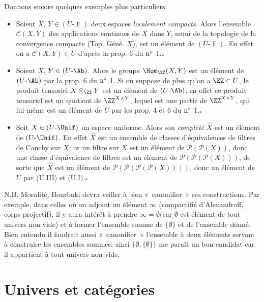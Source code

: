 Donnons encore quelques exemples plus particuliers:
\begin{itemize}
\item[* 1)] Soient $X$, $Y\in (U\text{-}\Top)$ deux espaces \emph{localement
compacts}. Alors l'ensemble $\mathscr{C}(X,Y)$ des applications
continues de $X$ dans $Y$, muni de la topologie de la convergence
compacte (Top. Géné. $X$), est un élément de $(U\text{-}\Top)$. En
effet on a $\mathscr{C}(X,Y)\in U$ d'après la prop. 6 du ${\rm
n^{\circ}}$ 1.${}_{\mbox{*}}$

\item[* 2)] Soient $X$, $Y\in (U\text{-}\Ab)$. Alors le groupe
$\Hom_{\ZZ}(X,Y)$ est un élément de $(U\text{-}\Ab)$ par la prop. 6
du ${\rm n^{\circ}}$ 1. Si on suppose de plus qu'on a $\ZZ\in U$, le
produit tensoriel $X\otimes_{\ZZ}Y$ est un élément de
$(U\text{-}\Ab)$; en effet ce produit tensoriel est un quotient de
$\ZZ^{X\times Y}$, lequel est une partie de $\ZZ^{X\times Y}$, qui
lui-même est un élément de $U$ par les prop. 4 et 6 du ${\rm
n^{\circ}}$ 1.${}_{\mbox{*}}$

\item[* 3)] Soit $X\in (U\text{-}\Unif)$ un espace uniforme. Alors son
\emph{complété} $\widehat{X}$ est un élément de $(U\text{-}\Unif)$.
En effet $\widehat{X}$ est un ensemble de classes d'équivalences de
filtres de Cauchy sur $X$; or un filtre sur $X$ est un élément de
$\mathcal{P}(\mathcal{P}(X))$, donc une classe d'équivalence de
filtres est un élément de
$\mathcal{P}(\mathcal{P}(\mathcal{P}(X)))$, de sorte que
$\widehat{X}$ est un élément de
$\mathcal{P}(\mathcal{P}(\mathcal{P}(\mathcal{P}(X))))$, donc un
élément de $U$ par (U.III) et (U.I).${}_{\mbox{*}}$
\end{itemize}

N.B. Moralité, Bourbaki devra veiller à bien « canonifier » ses
constructions. Par exemple, dans celles où on adjoint un élément
$\infty$ (compactifié d'Alexandroff, corps projectif), il y aura
intérêt à prendre $\infty =∅$\pageoriginale (car
$∅$ est élément de tout univers non vide) et à former
l'ensemble somme de $\{∅\}$ et de l'ensemble donné. Bien
entendu il faudrait aussi « canonifier » l'ensemble à deux
éléments servant à construire les ensembles sommes; ainsi
$\{∅, \{∅\}\}$ me paraît un bon candidat car il
appartient à tout univers non vide.

\section{Univers et catégories}

